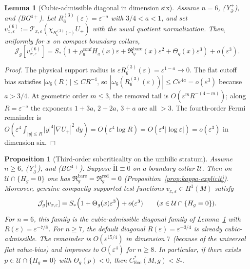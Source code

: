 \documentclass[11pt,reqno,a4paper]{amsart}
\numberwithin{equation}{section}
\theoremstyle{plain}
\newtheorem{lemma}[theorem]{Lemma}
\newtheorem{proposition}[theorem]{Proposition}
\newcommand{\Esc}{\ensuremath{\mathrm{Esc}}}
\theoremstyle{remark}
\theoremstyle{plain}
\begin{document}
\begin{lemma}[Cubic-admissible diagonal in dimension six]
\label{lem:cubic-diagonal-six}
Assume $n=6$, \textup{(Y$^+_{\partial}$)}, and \textup{(BG$^{4+}$)}.
Let $R_6^{(3)}(\varepsilon)=\varepsilon^{-a}$ with $3/4<a<1$, and set
$v^{(6)}_{x,\varepsilon}:=\mathcal T_{x,\varepsilon}(\chi_{R_6^{(3)}(\varepsilon)}U_+)$
with the usual quotient normalization.  Then, uniformly for $x$ on compact
boundary collars,
\[
\mathcal J_g[v^{(6)}_{x,\varepsilon}]
=S_\ast\left(
1+\rho_6^{\mathrm{conf}}H_g(x)\varepsilon
+\mathfrak R_g^{\mathrm{bare}}(x)\varepsilon^2
+\Theta_g(x)\varepsilon^3\right)+o(\varepsilon^3).
\]
\end{lemma}

\begin{proof}
The physical support radius is $\varepsilon R_6^{(3)}(\varepsilon)=\varepsilon^{1-a}\to0$.
The flat cutoff bias satisfies $|\omega_6(R)|\le CR^{-4}$, so
$|\omega_6(R_6^{(3)}(\varepsilon))|\le C\varepsilon^{4a}=o(\varepsilon^3)$
because $a>3/4$.
At geometric order $m\le3$, the removed tail is
$O(\varepsilon^mR^{-(4-m)})$; along $R=\varepsilon^{-a}$ the exponents
$1+3a$, $2+2a$, $3+a$ are all $>3$.
The fourth-order Fermi remainder is
$O(\varepsilon^4\int_{|y|\le R}|y|^4|\nabla U_+|^2\,dy)
=O(\varepsilon^4\log R)=O(\varepsilon^4|\log\varepsilon|)=o(\varepsilon^3)$
in dimension six.
\end{proof}

\begin{proposition}[Third-order subcriticality on the umbilic stratum]
\label{prop:third-order-hand-off}
Assume $n\ge6$, \textup{(Y$^+_{\partial}$)}, and \textup{(BG$^{4+}$)}.
Suppose $\mathring{\mathrm{II}}\equiv0$ on a boundary collar $\mathcal U$.
Then on $\mathcal U\cap\{H_g=0\}$ one has
$\mathfrak R_g^{\mathrm{bare}}=\mathfrak R_g^{\mathrm{red}}=0$
(Proposition~\ref{prop:kappa-explicit}).
Moreover, genuine compactly supported test functions
$v_{x,\varepsilon}\in H^1(M)$ satisfy
\[
\mathcal J_g[v_{x,\varepsilon}]
=
S_\ast\Bigl(1+\Theta_g(x)\varepsilon^3\Bigr)+o(\varepsilon^3)
\qquad (x\in \mathcal U\cap\{H_g=0\}).
\]
For $n=6$, this family is the cubic-admissible diagonal family of
Lemma~\ref{lem:cubic-diagonal-six} with $R(\varepsilon)=\varepsilon^{-7/8}$.
For $n\ge7$, the default diagonal $R(\varepsilon)=\varepsilon^{-3/4}$ is
already cubic-admissible.  The remainder is $O(\varepsilon^{15/4})$ in
dimension $7$ (because of the universal flat value-bias) and improves to
$O(\varepsilon^4)$ for $n\ge8$.
In particular, if there exists $p\in \mathcal U\cap\{H_g=0\}$ with
$\Theta_g(p)<0$, then $C_{\Esc}^*(M,g)<S_\ast$.
\end{proposition}
\end{document}
